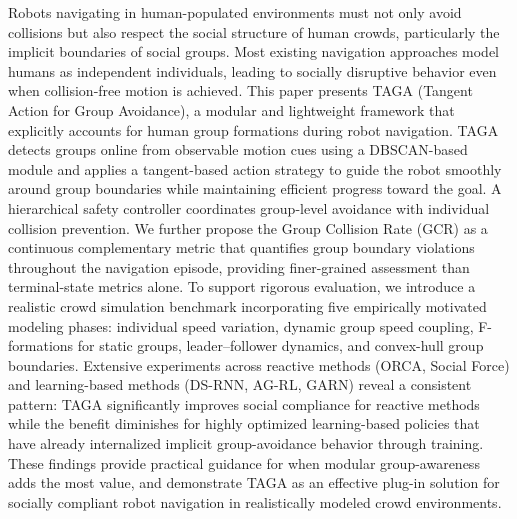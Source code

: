 Robots navigating in human-populated environments must not only avoid collisions but also respect the social structure of human crowds, particularly the implicit boundaries of social groups. Most existing navigation approaches model humans as independent individuals, leading to socially disruptive behavior even when collision-free motion is achieved. This paper presents TAGA (Tangent Action for Group Avoidance), a modular and lightweight framework that explicitly accounts for human group formations during robot navigation. TAGA detects groups online from observable motion cues using a DBSCAN-based module and applies a tangent-based action strategy to guide the robot smoothly around group boundaries while maintaining efficient progress toward the goal. A hierarchical safety controller coordinates group-level avoidance with individual collision prevention. We further propose the Group Collision Rate (GCR) as a continuous complementary metric that quantifies group boundary violations throughout the navigation episode, providing finer-grained assessment than terminal-state metrics alone. To support rigorous evaluation, we introduce a realistic crowd simulation benchmark incorporating five empirically motivated modeling phases: individual speed variation, dynamic group speed coupling, F-formations for static groups, leader--follower dynamics, and convex-hull group boundaries. Extensive experiments across reactive methods (ORCA, Social Force) and learning-based methods (DS-RNN, AG-RL, GARN) reveal a consistent pattern: TAGA significantly improves social compliance for reactive methods while the benefit diminishes for highly optimized learning-based policies that have already internalized implicit group-avoidance behavior through training. These findings provide practical guidance for when modular group-awareness adds the most value, and demonstrate TAGA as an effective plug-in solution for socially compliant robot navigation in realistically modeled crowd environments.

